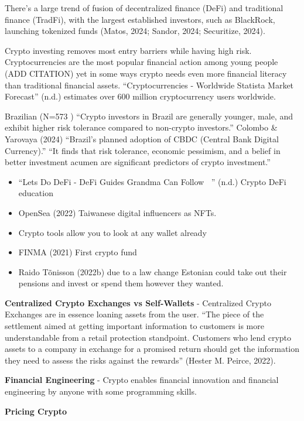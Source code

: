 \documentclass[
  letterpaper,
  DIV=11,
  numbers=noendperiod]{scrartcl}
\begin{document}
There's a large trend of fusion of decentralized finance (DeFi) and
traditional finance (TradFi), with the largest established investors,
such as BlackRock, launching tokenized funds (Matos, 2024; Sandor, 2024;
Securitize, 2024).

Crypto investing removes most entry barriers while having high risk.
Cryptocurrencies are the most popular financial action among young
people (ADD CITATION) yet in some ways crypto needs even more financial
literacy than traditional financial assets. {``Cryptocurrencies -
{Worldwide} {\textbar} {Statista Market Forecast}''} (n.d.) estimates
over 600 million cryptocurrency users worldwide.

Brazilian (N=573 ) ``Crypto investors in Brazil are generally younger,
male, and exhibit higher risk tolerance compared to non-crypto
investors.'' Colombo \& Yarovaya (2024) ``Brazil's planned adoption of
CBDC (Central Bank Digital Currency).'' ``It finds that risk tolerance,
economic pessimism, and a belief in better investment acumen are
significant predictors of crypto investment.''

\begin{itemize}
\item
  {``Lets {Do DeFi} - {DeFi Guides Grandma Can Follow} 👵🏻''} (n.d.)
  Crypto DeFi education
\item
  OpenSea (2022) Taiwanese digital influencers as NFTs.
\item
  Crypto tools allow you to look at any wallet already
\item
  FINMA (2021) First crypto fund
\item
  Raido Tõnisson (2022b) due to a law change Estonian could take out
  their pensions and invest or spend them however they wanted.
\end{itemize}

\textbf{Centralized Crypto Exchanges vs Self-Wallets} - Centralized
Crypto Exchanges are in essence loaning assets from the user. ``The
piece of the settlement aimed at getting important information to
customers is more understandable from a retail protection standpoint.
Customers who lend crypto assets to a company in exchange for a promised
return should get the information they need to assess the risks against
the rewards'' (Hester M. Peirce, 2022).

\textbf{Financial Engineering} - Crypto enables financial innovation and
financial engineering by anyone with some programming skills.

\textbf{Pricing Crypto}
\end{document}
